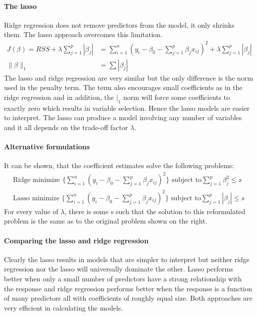 \documentclass[../document.tex]{subfiles}
\begin{document}
	\paragraph{The lasso}
	Ridge regression does not remove predictors from the model, it only shrinks them. The lasso approach overcomes this limitation.
	\begin{equation}
	\begin{split}
		J(\beta) = RSS+\lambda\sum_{j=1}^{p}|\beta_{j}| &= \sum_{i=1}^{n}(y_{i}-\beta_{0}-\sum_{j=1}^{p}\beta_{j}x_{ij})^2+\lambda\sum_{j=1}^{p}|\beta_{j}|\\
		\|\beta\|_{1}&=\sum|\beta_{j}|
	\end{split}
	\end{equation}
	The lasso and ridge regression are very similar but the only difference is the norm used in the penalty term. The term also encourages small coefficients as in the ridge regression and in addition, the \(|_{1}\) norm will force some coefficients to exactly zero which results in variable selection. Hence the lasso models are easier to interpret. The lasso can produce a model involving any number of variables and it all depends on the trade-off factor \(\lambda\).

	\paragraph{Alternative formulations}
	It can be shown, that the coefficient estimates solve the following problems:
	\begin{equation}
	\begin{split}
		\text{Ridge minimize }\{\sum_{i=1}^{n}(y_{i}-\beta_{0}-\sum_{j=1}^{p}\beta_{j}x_{ij})^2\}\text{ subject to}\sum_{j=1}^{p}\beta_{j}^2\leq s\\
		\text{Lasso minimize }\{\sum_{i=1}^{n}(y_{i}-\beta_{0}-\sum_{j=1}^{p}\beta_{j}x_{ij})^2\}\text{ subject to}\sum_{j=1}^{p}|\beta_{j}|\leq s
	\end{split}
	\end{equation}
	For every value of \(\lambda\), there is some s such that the solution to this reformulated problem is the same as to the original problem shown on the right.

	\paragraph{Comparing the lasso and ridge regression}
	Clearly the lasso results in models that are simpler to interpret but neither ridge regression nor the lasso will universally dominate the other. Lasso performs better when only a small number of predictors have a strong relationship with the response and ridge regression performs better when the response is a function of many predictors all with coefficients of roughly equal size. Both approaches are very efficient in calculating the models.
\end{document}
